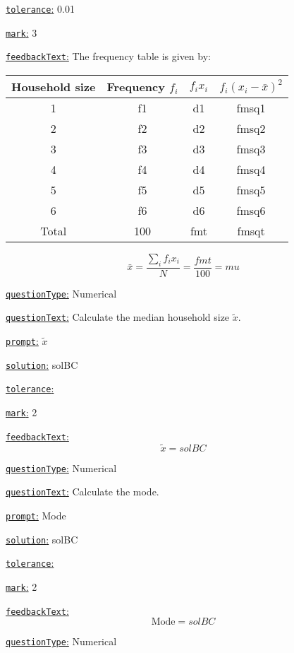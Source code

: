 \documentclass[preview]{standalone}
\newcommand \fieldname[1]{\underline{\texttt{#1}:}}
\begin{document}
\fieldname{tolerance}
0.01

\fieldname{mark}
3

\fieldname{feedbackText}
The frequency table is given by:

\begin{tabular}{cccc}
Household size & Frequency $f_i$ & $f_i x_i$ & $f_i (x_i-\bar x)^2$\\
\hline
1 & {f1} & {d1} & {fmsq1}\\
2 & {f2} & {d2} & {fmsq2}\\
3 & {f3} & {d3} & {fmsq3}\\
4 & {f4} & {d4} & {fmsq4}\\
5 & {f5} & {d5} & {fmsq5}\\
6 & {f6} & {d6} & {fmsq6}\\
\hline
Total & 100 & {fmt} & {fmsqt} \\
\hline
\end{tabular}

\[
\bar x = \frac{\sum_i f_i x_i}{N} =\frac{fmt}{100} = {mu}
\]

\fieldname{questionType}
Numerical

\fieldname{questionText}
Calculate the median household size $\tilde x$.

\fieldname{prompt}
$\tilde x$

\fieldname{solution}
solBC

\fieldname{tolerance}


\fieldname{mark}
2

\fieldname{feedbackText}
\[
\tilde x = {solBC}
\]

\fieldname{questionType}
Numerical

\fieldname{questionText}
Calculate the mode.

\fieldname{prompt}
Mode

\fieldname{solution}
solBC

\fieldname{tolerance}


\fieldname{mark}
2

\fieldname{feedbackText}
\[
\textrm{Mode} = {solBC}
\]

\fieldname{questionType}
Numerical
\end{document}
